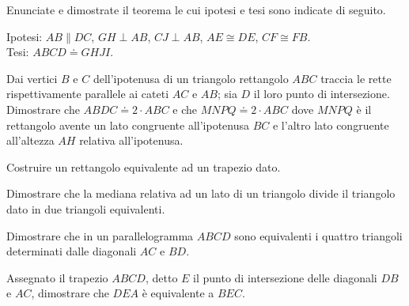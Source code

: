 \begin{multicols}{2}

\begin{esercizio}
\label{ese:7.1}
Enunciate e dimostrate il teorema le cui ipotesi e tesi sono indicate 
di seguito.

\noindent Ipotesi: \(AB\parallel DC\), \(GH\perp AB\), \(CJ\perp AB\), 
\(AE\cong DE\), \(CF\cong FB\).\\
\noindent Tesi: \(ABCD\doteq GHJI\).\\

%
\end{esercizio}
 
\begin{esercizio}
\label{ese:7.2}
Dai vertici \(B\) e \(C\) dell'ipotenusa di un triangolo rettangolo \(ABC\) 
traccia le rette rispettivamente parallele ai cateti \(AC\) e \(AB\); sia 
\(D\) il loro punto di intersezione. Dimostrare che \(ABDC\doteq 2\cdot 
ABC\) e che \(MNPQ\doteq 2\cdot ABC\) dove \(MNPQ\) è il rettangolo avente 
un lato congruente all'ipotenusa \(BC\) e l'altro lato congruente 
all'altezza \(AH\) relativa all'ipotenusa.
\end{esercizio}

\begin{esercizio}
\label{ese:7.3}
Costruire un rettangolo equivalente ad un trapezio dato.
\end{esercizio}

\begin{esercizio}
\label{ese:7.4}
Dimostrare che la mediana relativa ad un lato di un triangolo divide 
il triangolo dato in due triangoli equivalenti.
\end{esercizio}

\begin{esercizio}
\label{ese:7.5}
Dimostrare che in un parallelogramma \(ABCD\) sono equivalenti i 
quattro triangoli determinati dalle diagonali \(AC\) e \(BD\).
\end{esercizio}

\begin{esercizio}
\label{ese:7.6}
Assegnato il trapezio \(ABCD\), detto \(E\) il punto di intersezione 
delle diagonali \(DB\) e \(AC\), dimostrare che \(DEA\) è equivalente a 
\(BEC\).
\end{esercizio}


\end{multicols}
